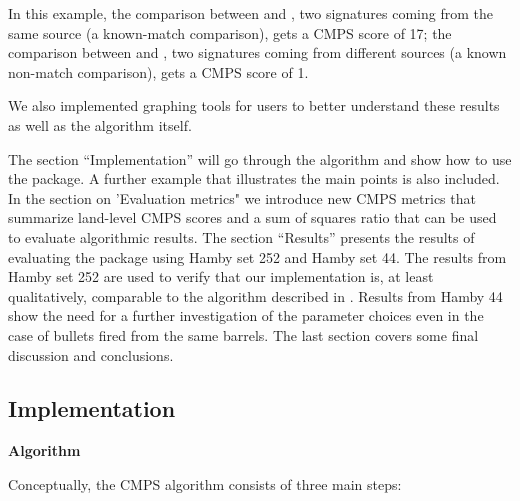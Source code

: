 In this example, the comparison between  and , two
signatures coming from the same source (a known-match comparison), gets
a CMPS score of 17; the comparison between  and ,
two signatures coming from different sources (a known non-match
comparison), gets a CMPS score of 1.

We also implemented graphing tools for users to better understand these
results as well as the algorithm itself.

The section ``Implementation'' will go through the algorithm and show
how to use the  package. A further example that illustrates
the main points is also included. In the section on 'Evaluation metrics"
we introduce new CMPS metrics that summarize land-level CMPS scores and
a sum of squares ratio that can be used to evaluate algorithmic results.
The section ``Results'' presents the results of evaluating the
 package using Hamby set 252 and Hamby set 44. The results
from Hamby set 252 are used to verify that our implementation is, at
least qualitatively, comparable to the algorithm described in
\citet{cmps}. Results from Hamby 44 show the need for a further
investigation of the parameter choices even in the case of bullets fired
from the same barrels. The last section covers some final discussion and
conclusions.

\hypertarget{implementation}{%
\subsection{Implementation}\label{implementation}}

\textbf{Algorithm}

Conceptually, the CMPS algorithm consists of three main steps:

